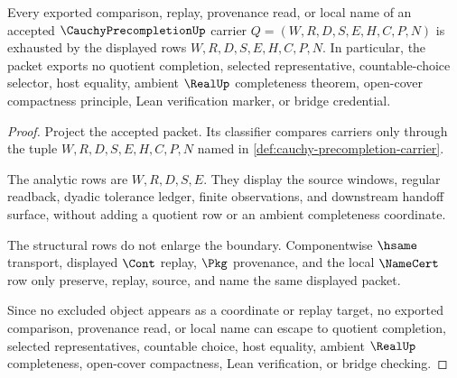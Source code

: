 \begin{theorem}
\label{thm:cauchy-precompletion-nonescape}
Every exported comparison, replay, provenance read, or local name of an accepted $\CauchyPrecompletionUp$ carrier $Q=(W,R,D,S,E,H,C,P,N)$ is exhausted by the displayed rows $W,R,D,S,E,H,C,P,N$. In particular, the packet exports no quotient completion, selected representative, countable-choice selector, host equality, ambient $\RealUp$ completeness theorem, open-cover compactness principle, Lean verification marker, or bridge credential.
\end{theorem}
\begin{proof}
Project the accepted packet. Its classifier compares carriers only through the tuple $W,R,D,S,E,H,C,P,N$ named in \autoref{def:cauchy-precompletion-carrier}.

The analytic rows are $W,R,D,S,E$. They display the source windows, regular readback, dyadic tolerance ledger, finite observations, and downstream handoff surface, without adding a quotient row or an ambient completeness coordinate.

The structural rows do not enlarge the boundary. Componentwise $\hsame$ transport, displayed $\Cont$ replay, $\Pkg$ provenance, and the local $\NameCert$ row only preserve, replay, source, and name the same displayed packet.

Since no excluded object appears as a coordinate or replay target, no exported comparison, provenance read, or local name can escape to quotient completion, selected representatives, countable choice, host equality, ambient $\RealUp$ completeness, open-cover compactness, Lean verification, or bridge checking.
\end{proof}


